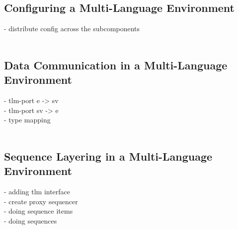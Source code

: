 \subsection{Configuring a Multi-Language Environment}
- distribute config across the subcomponents\\
\\
\subsection{Data Communication in a Multi-Language Environment} \label{ml_tlm}
- tlm-port e -> sv\\
- tlm-port sv -> e\\
- type mapping\\
\\
\subsection{Sequence Layering in a Multi-Language Environment}
- adding tlm interface\\
- create proxy sequencer\\
- doing sequence items\\
- doing sequences\\